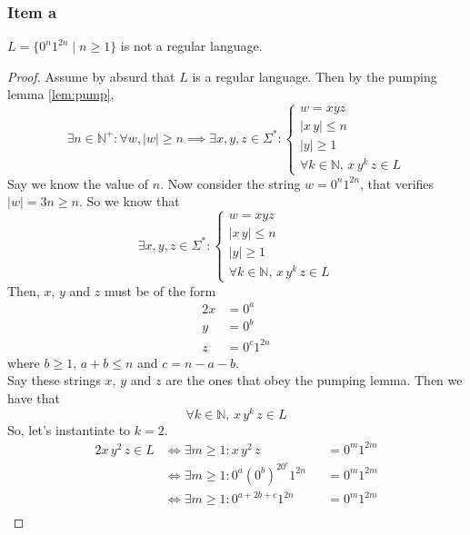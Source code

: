 {\subsubsection{Item a}
\begin{theorem}
	$L=\{0^n1^{2n}\mid n\geq 1\}$ is not a regular language.
\end{theorem}
\begin{proof}
Assume by absurd that $L$ is a regular language. Then by the pumping lemma \eqref{lem:pump},
\begin{equation*}
	\exists n \in \mathbb{N}^+ \colon \forall w, |w|\geq n \implies \exists x, y, z \in \Sigma^* \colon 
	\begin{cases}
		w = xyz \\
		|x\,y| \leq n\\
		|y| \geq 1\\
		\forall k \in \mathbb{N},\,x\,y^k\,z \in L
\end{cases}
\end{equation*}
Say we know the value of $n$. Now consider the string $w=0^n1^{2n}$, that verifies $|w|=3n \geq n$. So we know that
\begin{equation*}
\exists x, y, z \in \Sigma^* \colon 
\begin{cases}
	w = xyz \\
	|x\,y| \leq n\\
	|y| \geq 1\\
	\forall k \in \mathbb{N},\,x\,y^k\,z \in L
\end{cases}
\end{equation*}
Then, $x$, $y$ and $z$ must be of the form
\begin{alignat*}{2}
	x &= 0^a\\
	y &= 0^b\\
	z &= 0^c1^{2n}
\end{alignat*}
where $b \geq 1$, $a+b \leq n$ and $c=n-a-b$.\\
Say these strings $x$, $y$ and $z$ are the ones that obey the pumping lemma. Then we have that
\begin{equation*}
	\forall k \in \mathbb{N},\,x\,y^k\,z \in L
\end{equation*}
So, let's instantiate to $k=2$.
\begin{alignat*}{2}
	x\,y^2\,z \in L
	& \iff \exists m \geq 1 \colon x\,y^2\,z           &&= 0^m1^{2m} \\
	& \iff \exists m \geq 1 \colon 0^a(0^b)^20^c1^{2n} &&= 0^m1^{2m} \\
	& \iff \exists m \geq 1 \colon 0^{a+2b+c}1^{2n}    &&= 0^m1^{2m} \\

\end{alignat*}
\end{proof}}
